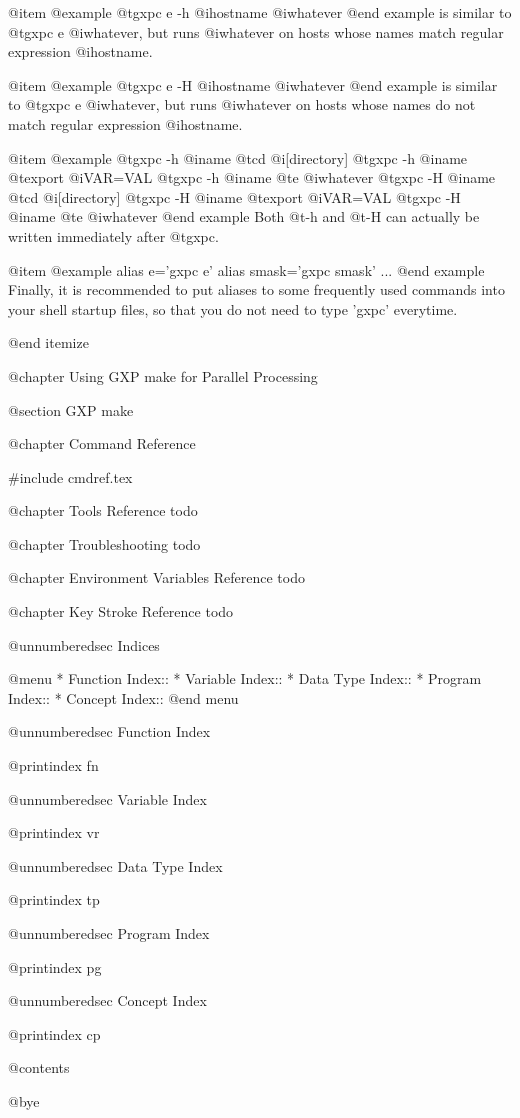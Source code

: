 @item 
@example
@t{gxpc e} -h @i{hostname} @i{whatever}
@end example
is similar to @t{gxpc e} @i{whatever}, but runs @i{whatever} on
hosts whose names match regular expression @i{hostname}. 

@item 
@example
@t{gxpc e} -H @i{hostname} @i{whatever}
@end example
is similar to @t{gxpc e} @i{whatever}, but runs @i{whatever} on
hosts whose names do not match regular expression @i{hostname}. 

@item 
@example
@t{gxpc -h} @i{name} @t{cd} @i{[directory]}
@t{gxpc -h} @i{name} @t{export} @i{VAR=VAL}
@t{gxpc -h} @i{name} @t{e} @i{whatever}
@t{gxpc -H} @i{name} @t{cd} @i{[directory]}
@t{gxpc -H} @i{name} @t{export} @i{VAR=VAL}
@t{gxpc -H} @i{name} @t{e} @i{whatever}
@end example
Both @t{-h} and @t{-H} can actually be written immediately after @t{gxpc}.

@item
@example
alias e='gxpc e'
alias smask='gxpc smask'
...
@end example
Finally, it is recommended to put aliases to some frequently used
commands into your shell startup files, so that you do not need to
type 'gxpc' everytime.


@end itemize




@chapter Using GXP make for Parallel Processing

@section GXP make



@chapter Command Reference

#include cmdref.tex

@chapter Tools Reference
todo

@chapter Troubleshooting
todo

@chapter Environment Variables Reference
todo

@chapter Key Stroke Reference
todo

@unnumberedsec Indices

@menu
* Function Index::              
* Variable Index::              
* Data Type Index::             
* Program Index::               
* Concept Index::               
@end menu

@unnumberedsec Function Index

@printindex fn

@unnumberedsec Variable Index

@printindex vr

@unnumberedsec Data Type Index

@printindex tp

@unnumberedsec Program Index

@printindex pg

@unnumberedsec Concept Index

@printindex cp


@contents

@bye
                                   

